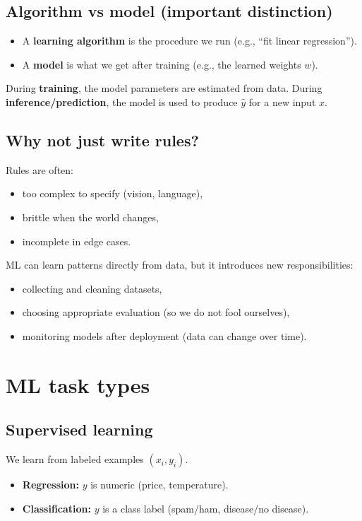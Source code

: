 \documentclass[11pt]{article}
\begin{document}
\subsection{Algorithm vs model (important distinction)}
\begin{itemize}[leftmargin=*]
  \item A \textbf{learning algorithm} is the procedure we run (e.g., ``fit linear regression'').
  \item A \textbf{model} is what we get after training (e.g., the learned weights $w$).
\end{itemize}
During \textbf{training}, the model parameters are estimated from data.
During \textbf{inference/prediction}, the model is used to produce $\hat{y}$ for a new input $x$.

\subsection{Why not just write rules?}
Rules are often:
\begin{itemize}[leftmargin=*]
  \item too complex to specify (vision, language),
  \item brittle when the world changes,
  \item incomplete in edge cases.
\end{itemize}
ML can learn patterns directly from data, but it introduces new responsibilities:
\begin{itemize}[leftmargin=*]
  \item collecting and cleaning datasets,
  \item choosing appropriate evaluation (so we do not fool ourselves),
  \item monitoring models after deployment (data can change over time).
\end{itemize}

\section{ML task types}
\subsection{Supervised learning}
We learn from labeled examples $(x_i, y_i)$.
\begin{itemize}[leftmargin=*]
  \item \textbf{Regression:} $y$ is numeric (price, temperature).
  \item \textbf{Classification:} $y$ is a class label (spam/ham, disease/no disease).
\end{itemize}
\end{document}

